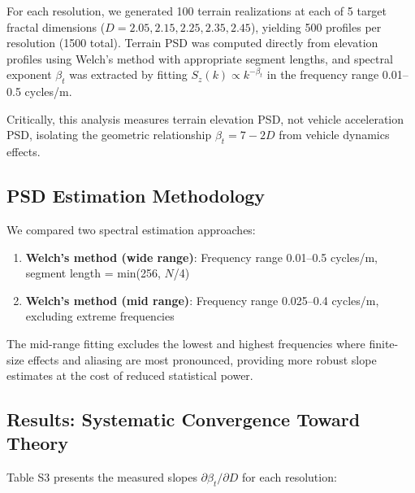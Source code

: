 \documentclass[11pt]{article}
\begin{document}
For each resolution, we generated 100 terrain realizations at each of 5 target fractal dimensions ($D = 2.05, 2.15, 2.25, 2.35, 2.45$), yielding 500 profiles per resolution (1500 total). Terrain PSD was computed directly from elevation profiles using Welch's method with appropriate segment lengths, and spectral exponent $\beta_t$ was extracted by fitting $S_z(k) \propto k^{-\beta_t}$ in the frequency range 0.01--0.5 cycles/m.

Critically, this analysis measures terrain elevation PSD, not vehicle acceleration PSD, isolating the geometric relationship $\beta_t = 7-2D$ from vehicle dynamics effects.

\subsection{PSD Estimation Methodology}

We compared two spectral estimation approaches:
\begin{enumerate}
\item \textbf{Welch's method (wide range)}: Frequency range 0.01--0.5 cycles/m, segment length = min(256, $N$/4)
\item \textbf{Welch's method (mid range)}: Frequency range 0.025--0.4 cycles/m, excluding extreme frequencies
\end{enumerate}

The mid-range fitting excludes the lowest and highest frequencies where finite-size effects and aliasing are most pronounced, providing more robust slope estimates at the cost of reduced statistical power.

\subsection{Results: Systematic Convergence Toward Theory}

Table S3 presents the measured slopes $\partial \beta_t / \partial D$ for each resolution:
\end{document}
